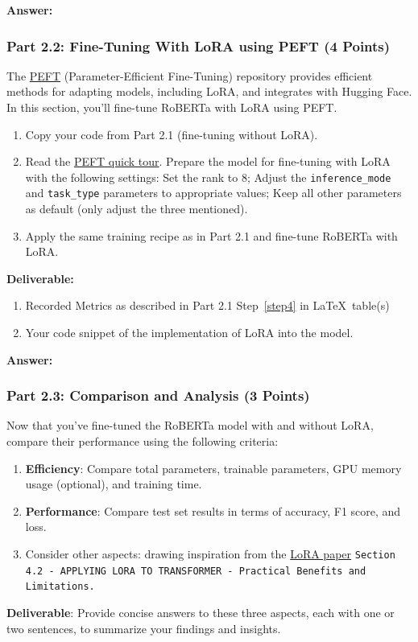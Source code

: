 \documentclass[11pt, oneside]{article}   	%
\begin{document}
\textbf{Answer:} \\

\subsubsection*{Part 2.2: Fine-Tuning With LoRA using PEFT (4 Points)}
The \href{https://github.com/huggingface/peft}{PEFT} (Parameter-Efficient Fine-Tuning) repository provides efficient methods for adapting models, including LoRA, and integrates with Hugging Face. In this section, you’ll fine-tune RoBERTa with LoRA using PEFT.
\begin{enumerate}
    \item Copy your code from Part 2.1 (fine-tuning without LoRA).
    \item \label{step2} Read the \href{https://huggingface.co/docs/peft/quicktour}{PEFT quick tour}. Prepare the model for fine-tuning with LoRA with the following settings: Set the rank to 8; Adjust the \texttt{inference\_mode} and \texttt{task\_type} parameters to appropriate values; Keep all other parameters as default (only adjust the three mentioned).
   \item Apply the same training recipe as in Part 2.1 and fine-tune RoBERTa with LoRA.
\end{enumerate}


\textbf{Deliverable:}
\begin{enumerate}
    \item Recorded Metrics as described in Part 2.1 Step~\ref{step4} in \LaTeX~table(s)
    \item Your code snippet of the implementation of LoRA into the model.
\end{enumerate}

\textbf{Answer:} \\

\subsubsection*{Part 2.3: Comparison and Analysis (3 Points)}

Now that you've fine-tuned the RoBERTa model with and without LoRA, compare their performance using the following criteria:
\begin{enumerate}
    \item \textbf{Efficiency}: Compare total parameters, trainable parameters, GPU memory usage (optional), and training time.
    \item \textbf{Performance}: Compare test set results in terms of accuracy, F1 score, and loss.
    \item Consider other aspects: drawing inspiration from the \href{https://arxiv.org/abs/2106.09685}{LoRA paper} \texttt{Section 4.2 - APPLYING LORA TO TRANSFORMER - Practical Benefits and Limitations.}
\end{enumerate}
\textbf{Deliverable}: Provide concise answers to these three aspects, each with one or two sentences, to summarize your findings and insights.
\end{document}
